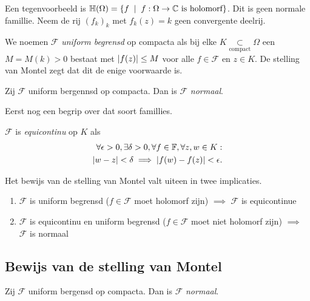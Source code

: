\begin{vb}
	Een tegenvoorbeeld is $\mathbb{H}(\Omega) = \{f \st f: \Omega \to \C\text{ is holomorf}\} $. 
	Dit is geen normale famillie. 
	Neem de  rij  $(f_k)_k$ met $f_k(z) = k$ geen convergente deelrij.
\end{vb}
We noemen $\mathcal{F} $ \emph{uniform begrensd} op compacta als bij elke $K \underset{\text{compact}}\subset \Omega$ een $M = M(k) > 0$ bestaat met $\left| f(z) \right| \le M$ voor alle $f \in \mathcal{F} $ en $z \in K$. 
De stelling van Montel zegt dat dit de enige voorwaarde is. 
\begin{stelling}
	Zij $\mathcal{F} $ uniform bergennsd op compacta. Dan is $\mathcal{F} $ \emph{normaal}.
\end{stelling}
Eerst nog een begrip over dat soort famillies. 
\begin{definitie}
	$\mathcal{F} $ is \emph{equicontinu} op $K$ als 
	\begin{align*}
		\forall \epsilon > 0, \exists \delta > 0, \forall  f \in \mathbb{F}, \forall z, w  \in K:\\
		\left| w - z \right| < \delta \implies \left| f(w) - f(z)  \right| < \epsilon
	.\end{align*}
\end{definitie}
Het bewijs van de stelling van Montel valt uiteen in twee implicaties. 
\begin{enumerate}
	\item  $\mathcal{F} $ is uniform begrensd ($f \in \mathcal{F}$ moet holomorf zijn) $\implies $ $\mathcal{F} $ is equicontinue
	\item $\mathcal{F}  $ is equicontinu en uniform begrensd ($f \in \mathcal{F} $ moet niet holomorf zijn) $\implies$ $\mathcal{F}  $ is normaal
\end{enumerate}

\subsection{Bewijs  van de stelling van Montel} \label{sec:bewijs__van_de_stelling_van_montel}

\begin{stelling}
	Zij $\mathcal{F} $ uniform bergensd op compacta. Dan is $\mathcal{F} $ \emph{normaal}.
\end{stelling}



